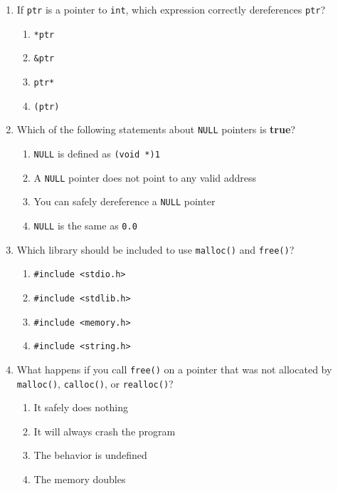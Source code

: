 \documentclass[a4paper,12pt]{article}
\begin{document}
\begin{enumerate}
  \item If \texttt{ptr} is a pointer to \texttt{int}, which expression correctly dereferences \texttt{ptr}?
  \begin{enumerate}[label=(\alph*)]
    \item \texttt{*ptr}
    \item \texttt{\&ptr}
    \item \texttt{ptr*}
    \item \texttt{(ptr)}
  \end{enumerate}

  \newpage

  \item Which of the following statements about \texttt{NULL} pointers is \textbf{true}?
  \begin{enumerate}[label=(\alph*)]
    \item \texttt{NULL} is defined as \texttt{(void *)1}
    \item A \texttt{NULL} pointer does not point to any valid address
    \item You can safely dereference a \texttt{NULL} pointer
    \item \texttt{NULL} is the same as \texttt{0.0}
  \end{enumerate}

  \item Which library should be included to use \texttt{malloc()} and \texttt{free()}?
  \begin{enumerate}[label=(\alph*)]
    \item \texttt{\#include <stdio.h>}
    \item \texttt{\#include <stdlib.h>}
    \item \texttt{\#include <memory.h>}
    \item \texttt{\#include <string.h>}
  \end{enumerate}

  \item What happens if you call \texttt{free()} on a pointer that was not allocated by \texttt{malloc()}, \texttt{calloc()}, or \texttt{realloc()}?
  \begin{enumerate}[label=(\alph*)]
    \item It safely does nothing
    \item It will always crash the program
    \item The behavior is undefined
    \item The memory doubles
  \end{enumerate}


\end{enumerate}
\end{document}
